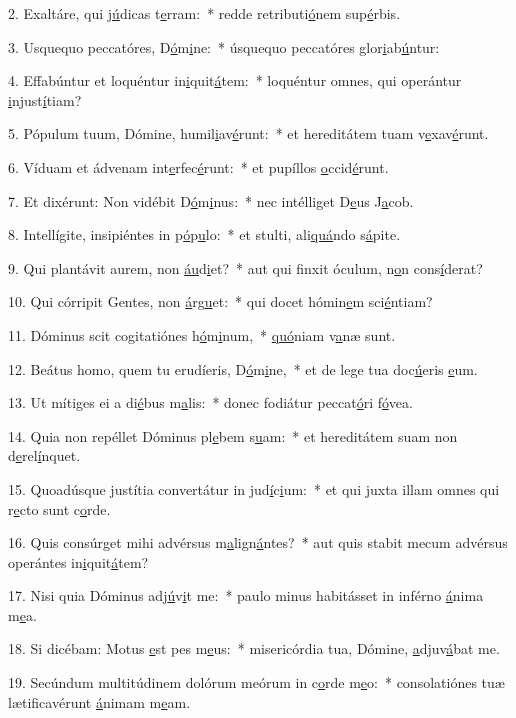 2. Exaltáre, qui j\uline{ú}dicas t\uline{e}rram:~* redde retributi\uline{ó}nem sup\uline{é}rbis.\par 
3. Usquequo peccatóres, D\uline{ó}m\uline{i}ne:~* úsquequo peccatóres glor\uline{i}ab\uline{ú}ntur:\par 
4. Effabúntur et loquéntur in\uline{i}quit\uline{á}tem:~* loquéntur omnes, qui operántur \uline{i}njust\uline{í}tiam?\par 
5. Pópulum tuum, Dómine, humil\uline{i}av\uline{é}runt:~* et hereditátem tuam v\uline{e}xav\uline{é}runt.\par 
6. Víduam et ádvenam int\uline{e}rfec\uline{é}runt:~* et pupíllos \uline{o}ccid\uline{é}runt.\par 
7. Et dixérunt: Non vidébit D\uline{ó}m\uline{i}nus:~* nec intélliget D\uline{e}us J\uline{a}cob.\par 
8. Intellígite, insipiéntes in p\uline{ó}p\uline{u}lo:~* et stulti, ali\uline{quá}ndo s\uline{á}pite.\par 
9. Qui plantávit aurem, non \uline{áu}d\uline{i}et?~* aut qui finxit óculum, n\uline{o}n cons\uline{í}derat?\par 
10. Qui córripit Gentes, non \uline{á}rg\uline{u}et:~* qui docet hómin\uline{e}m sci\uline{é}ntiam?\par 
11. Dóminus scit cogitatiónes h\uline{ó}m\uline{i}num,~* \uline{quó}niam v\uline{a}næ sunt.\par 
12. Beátus homo, quem tu erudíeris, D\uline{ó}m\uline{i}ne,~* et de lege tua doc\uline{ú}eris \uline{e}um.\par 
13. Ut mítiges ei a di\uline{é}bus m\uline{a}lis:~* donec fodiátur peccat\uline{ó}ri f\uline{ó}vea.\par 
14. Quia non repéllet Dóminus pl\uline{e}bem s\uline{u}am:~* et hereditátem suam non d\uline{e}rel\uline{í}nquet.\par 
15. Quoadúsque justítia convertátur in jud\uline{í}c\uline{i}um:~* et qui juxta illam omnes qui r\uline{e}cto sunt c\uline{o}rde.\par 
16. Quis consúrget mihi advérsus m\uline{a}lign\uline{á}ntes?~* aut quis stabit mecum advérsus operántes in\uline{i}quit\uline{á}tem?\par 
17. Nisi quia Dóminus adj\uline{ú}v\uline{i}t me:~* paulo minus habitásset in inférno \uline{á}nima m\uline{e}a.\par 
18. Si dicébam: Motus \uline{e}st pes m\uline{e}us:~* misericórdia tua, Dómine, \uline{a}djuv\uline{á}bat me.\par 
19. Secúndum multitúdinem dolórum meórum in c\uline{o}rde m\uline{e}o:~* consolatiónes tuæ lætificavérunt \uline{á}nimam m\uline{e}am.\par 
